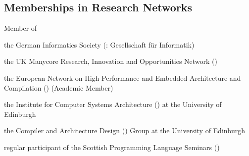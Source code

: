 \subsection{Memberships in Research Networks}
\begin{cvitemize}
    \item Member of
      \begin{inlineItemize}
        \item {}
        \item the German Informatics Society (\@: {\footnotesize Gesellschaft f{\"u}r Informatik})
        \item the UK Manycore Research, Innovation and Opportunities Network ()
        \item the European Network on High Performance and Embedded Architecture and Compilation () (Academic Member)
        \item the Institute for Computer Systems Architecture () at the University of Edinburgh
        \item the Compiler and Architecture Design () Group at the University of Edinburgh
        \item regular participant of the Scottish Programming Language Seminars ()
      \end{inlineItemize}
\end{cvitemize}

